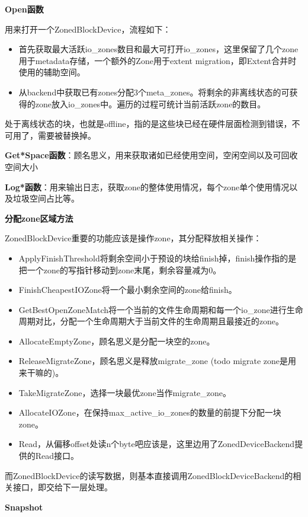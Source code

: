 \textbf {Open函数}

用来打开一个ZonedBlockDevice，流程如下：

\begin{itemize}
  \item 首先获取最大活跃io\_zones数目和最大可打开io\_zones，这里保留了几个zone用于metadata存储，一个额外的Zone用于extent migration，即Extent合并时使用的辅助空间。
  \item 从backend中获取已有zones分配3个meta\_zones。将剩余的非离线状态的可获得的zone放入io\_zones中。遍历的过程可统计当前活跃zone的数目。
\end{itemize}

处于离线状态的块，也就是offline，指的是这些块已经在硬件层面检测到错误，不可用了，需要被替换掉。

\textbf {Get*Space函数}：顾名思义，用来获取诸如已经使用空间，空闲空间以及可回收空间大小

\textbf {Log*函数}：用来输出日志，获取zone的整体使用情况，每个zone单个使用情况以及垃圾空间占比等。

\textbf {分配zone区域方法}

ZonedBlockDevice重要的功能应该是操作zone，其分配释放相关操作：

\begin{itemize}
\item ApplyFinishThreshold将剩余空间小于预设的块给finish掉，finish操作指的是把一个zone的写指针移动到zone末尾，剩余容量减为0。
\item FinishCheapestIOZone将一个最小剩余空间的zone给finish。
\item GetBestOpenZoneMatch将一个当前的文件生命周期和每一个io\_zone进行生命周期对比，分配一个生命周期大于当前文件的生命周期且最接近的zone。
\item AllocateEmptyZone，顾名思义是分配一块空的zone。
\item ReleaseMigrateZone，顾名思义是释放migrate\_zone (todo migrate zone是用来干嘛的)。
\item TakeMigrateZone，选择一块最优zone当作migrate\_zone。
\item AllocateIOZone，在保持max\_active\_io\_zones的数量的前提下分配一块zone。
\item Read，从偏移offset处读n个byte吧应该是，这里边用了ZonedDeviceBackend提供的Read接口。
\end{itemize}

而ZonedBlockDevice的读写数据，则基本直接调用ZonedBlockDeviceBackend的相关接口，即交给下一层处理。

\textbf{Snapshot}

